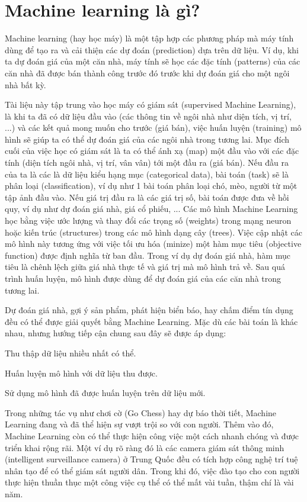 \section{Machine learning là gì?}
Machine learning (hay học máy) là một tập hợp các phương pháp mà máy tính dùng để tạo ra và cải thiện các dự đoán (prediction) dựa trên dữ liệu. Ví dụ, khi ta dự đoán giá của một căn nhà, máy tính sẽ học các đặc tính (patterns) của các căn nhà đã được bán thành công trước đó trước khi dự đoán giá cho một ngôi nhà bất kỳ.

Tài liệu này tập trung vào học máy có giám sát (supervised Machine Learning), là khi ta đã có dữ liệu đầu vào (các thông tin về ngôi nhà như diện tích, vị trí, ...) và các kết quả mong muốn cho trước (giá bán), việc huấn luyện (training) mô hình sẽ giúp ta có thể dự đoán giá của các ngôi nhà trong tương lai. Mục đích cuối của việc học có giám sát là ta có thể ánh xạ (map) một đầu vào với các đặc tính (diện tích ngôi nhà, vị trí, vân vân) tới một đầu ra (giá bán). Nếu đầu ra của ta là các là dữ liệu kiểu hạng mục (categorical data), bài toán (task) sẽ là phân loại (classification), ví dụ như 1 bài toán phân loại chó, mèo, người từ một tập ảnh đầu vào. Nếu giá trị đầu ra là các giá trị số, bài toán được đưa về hồi quy, ví dụ như dự đoán giá nhà, giá cổ phiếu, ... Các mô hình Machine Learning học bằng việc ước lượng và thay đổi các trọng số (weights) trong mạng neuron hoặc kiến trúc (structures) trong các mô hình dạng cây (trees). Việc cập nhật các mô hình này tương ứng với việc tối ưu hóa (minize) một hàm mục tiêu (objective function) được định nghĩa từ ban đầu. Trong ví dụ dự đoán giá nhà, hàm mục tiêu là chênh lệch giữa giá nhà thực tế và giá trị mà mô hình trả về. Sau quá trình huấn luyện, mô hình được dùng để dự đoán giá của các căn nhà trong tương lai.

Dự đoán giá nhà, gợi ý sản phẩm, phát hiện biển báo, hay chấm điểm tín dụng đều có thể được giải quyết bằng Machine Learning. Mặc dù các bài toán là khác nhau, nhưng hướng tiếp cận chung sau đây sẽ được áp dụng:

\begin{packed_enum}
    \item Thu thập dữ liệu nhiều nhất có thể. 
    \item Huấn luyện mô hình với dữ liệu thu được.
    \item Sử dụng mô hình đã được huấn luyện trên dữ liệu mới.
\end{packed_enum}

Trong những tác vụ như chơi cờ (Go Chess) hay dự báo thời tiết, Machine Learning đang và đã thể hiện sự vượt trội so với con người. Thêm vào đó, Machine Learning còn có thể thực hiện công việc một cách nhanh chóng và được triển khai rộng rãi. Một ví dụ rõ ràng đó là các camera giám sát thông minh (intelligent surveillance camera) ở Trung Quốc đều có tích hợp công nghệ trí tuệ nhân tạo để có thể giám sát người dân. Trong khi đó, việc đào tạo cho con người thực hiện thuần thục một công việc cụ thể có thể mất vài tuần, thậm chí là vài năm.

